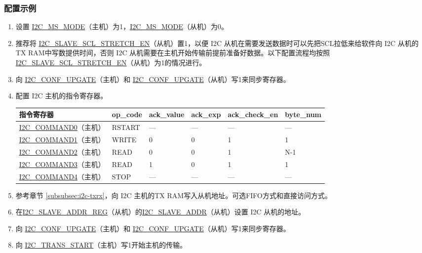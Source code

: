 \documentclass[main\_\_CN.tex]{subfiles}
\begin{document}
\subsubsection{配置示例}
\begin{enumerate}
\item 设置 \hyperref[fielddesc:I2CMSMODE]{I2C\_MS\_MODE}（主机）为1，\hyperref[fielddesc:I2CMSMODE]{I2C\_MS\_MODE}（从机）为0。
\item 推荐将 \hyperref[fielddesc:I2CSLAVESCLSTRETCHEN]{I2C\_SLAVE\_SCL\_STRETCH\_EN}（从机）置1，以便 I2C 从机在需要发送数据时可以先把SCL拉低来给软件向 I2C 从机的TX RAM中写数提供时间，否则 I2C 从机需要在主机开始传输前提前准备好数据。以下配置流程均按照\hyperref[fielddesc:I2CSLAVESCLSTRETCHEN]{I2C\_SLAVE\_SCL\_STRETCH\_EN}（从机）为1的情况进行。
\item 向 \hyperref[fielddesc:I2CCONFUPGATE]{I2C\_CONF\_UPGATE}（主机）和 \hyperref[fielddesc:I2CCONFUPGATE]{I2C\_CONF\_UPGATE}（从机）写1来同步寄存器。
\item 配置 I2C 主机的指令寄存器。
\clearpage
\begin{longtable}{ | p{4cm} | p{2cm} | p{2cm} | p{2cm} |p{2cm} | p{2cm} |}
\hline\rowcolor{lightgray}
指令寄存器& op\_code & ack\_value&ack\_exp&ack\_check\_en&byte\_num  \\ \hline
\hyperref[fielddesc:I2CCOMMAND0]{I2C\_COMMAND0}（主机）& RSTART& ---&---&---&---  \\ \hline
\hyperref[fielddesc:I2CCOMMAND1]{I2C\_COMMAND1}（主机）& WRITE& 0&0&1&1  \\ \hline
\hyperref[fielddesc:I2CCOMMAND2]{I2C\_COMMAND2}（主机）& READ& 0&0&1&N-1  \\ \hline
\hyperref[fielddesc:I2CCOMMAND3]{I2C\_COMMAND3}（主机）& READ& 1&0&1&1  \\ \hline
\hyperref[fielddesc:I2CCOMMAND4]{I2C\_COMMAND4}（主机）& STOP& ---&---&---&---  \\ \hline
\end{longtable}
\item 参考章节 \ref{subsubsec:i2c-txrx}，向 I2C 主机的TX RAM写入从机地址。可选FIFO方式和直接访问方式。
\item 在\hyperref[regdesc:I2CSLAVEADDRREG]{I2C\_SLAVE\_ADDR\_REG}（从机）的\hyperref[fielddesc:I2CSLAVEADDR]{I2C\_SLAVE\_ADDR}（从机）设置 I2C 从机的地址。
\item 向 \hyperref[fielddesc:I2CCONFUPGATE]{I2C\_CONF\_UPGATE}（主机）和 \hyperref[fielddesc:I2CCONFUPGATE]{I2C\_CONF\_UPGATE}（从机）写1来同步寄存器。
\item 向 \hyperref[fielddesc:I2CTRANSSTART]{I2C\_TRANS\_START}（主机）写1开始主机的传输。

\end{enumerate}
\end{document}

